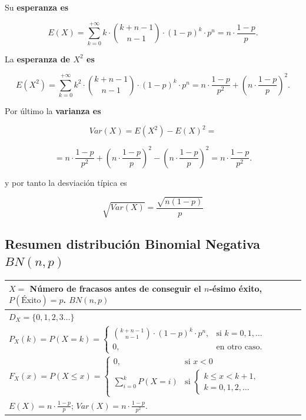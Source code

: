 \documentclass[
  letterpaper,
  DIV=11,
  numbers=noendperiod]{scrreprt}
\begin{document}
Su \textbf{esperanza es}

\[E(X)=\sum_{k=0}^{+\infty} k\cdot {k+n-1\choose n-1} \cdot (1-p)^{k}\cdot p^n=n\cdot\frac{1-p}{p}.\]

La \textbf{esperanza de \(X^2\) es}

\[E(X^2)=\sum_{k=0}^{+\infty} k^2\cdot {k+n-1\choose n-1} \cdot (1-p)^{k}\cdot p^n=n\cdot\frac{1-p}{p^2}+\left(n\cdot \frac{1-p}{p}\right)^2.\]

Por último la \textbf{varianza es}

\[
Var(X)=E(X^2)-E(X)^2=
\]

\[=n\cdot \frac{1-p}{p^2}+\left(n\cdot \frac{1-p}{p}\right)^2-\left(n\cdot \frac{1-p}{p}\right)^2=
n\cdot \frac{1-p}{p^2}.\]

y por tanto la desviación típica es

\[\sqrt{Var(X)} = \frac{\sqrt{n(1-p)}}{p}\]

\subsection{\texorpdfstring{Resumen distribución Binomial Negativa
\(BN(n,p)\)}{Resumen distribución Binomial Negativa BN(n,p)}}\label{resumen-distribuciuxf3n-binomial-negativa-bnnp}

\begin{table}
\centering
\begin{tabular}{|l|}
\hline\rowcolor{LightBlue}
 $X=$ Número de fracasos antes de conseguir el $n$-ésimo éxito, $P(\mbox{Éxito})=p$. $BN(n,p)$ 
\\\hline
$D_X=\{0,1,2,3\ldots\}$ \\\hline
$P_X(k)=P(X=k)=\left\{\begin{array}{ll} {k+n-1\choose n-1} \cdot (1-p)^{k}\cdot p^n, & \mbox{si } k=0,1,\ldots \\ 0, & \mbox{en otro caso.}\end{array}\right.$\\\hline
$
F_X(x)=P(X\leq x)=
\left\{
\begin{array}{ll} 0, & \mbox{si } x<0\\\displaystyle\sum_{i=0}^{k} P(X=i) & \mbox{si }\left\{\begin{array}{l}k\leq x< k+1,\\k=0,1,2,\ldots\end{array}\right.\end{array}\right.$ 
\\\hline
$E(X)=n\cdot\frac{1-p}{p}$; $Var(X)=n\cdot \frac{1-p}{p^2}.$ \\\hline
\end{tabular}
\end{table}
\end{document}
